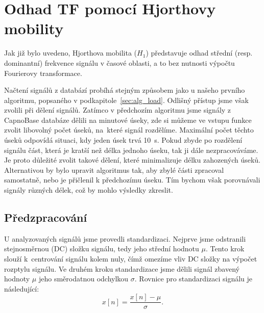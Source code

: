 \section{Odhad TF pomocí Hjorthovy mobility}
\label{sec:hjorth_mobilita_tf}
Jak již bylo uvedeno, Hjorthova mobilita (\( H_1 \)) představuje odhad střední (resp. dominantní) frekvence signálu v časové oblasti, a to bez nutnosti výpočtu Fourierovy transformace.

Načtení signálů z databází probíhá stejným způsobem jako u našeho prvního algoritmu, popsaného v podkapitole~\ref{sec:alg_load}.
Odlišný přístup jsme však zvolili při dělení signálů.
Zatímco v předchozím algoritmu jsme signály z CapnoBase databáze dělili na minutové úseky, zde si můžeme ve vstupu funkce zvolit libovolný počet úseků, na~které signál rozdělíme.
Maximální počet těchto úseků odpovídá situaci, kdy jeden úsek trvá 10~s.
Pokud zbyde po rozdělení signálu část, která je kratší než délka jednoho úseku, tak ji dále nezpracováváme.
Je proto důležité zvolit takové dělení, které minimalizuje délku zahozených úseků.
Alternativou by bylo upravit algoritmus tak, aby zbylé části zpracoval samostatně, nebo je přičlenil k předchozímu úseku.
Tím bychom však porovnávali signály různých délek, což by mohlo výsledky zkreslit.

\subsection*{Předzpracování}
\label{sec:predzpracovani}
U analyzovaných signálů jsme provedli standardizaci.
Nejprve jsme odstranili stejnosměrnou (\acs{DC}) složku signálu, tedy jeho střední hodnotu \(\mu\).
Tento krok slouží k~centrování signálu kolem nuly, čímž omezíme vliv \acs{DC} složky na výpočet rozptylu signálu.
Ve druhém kroku standardizace jsme dělili signál zbavený hodnoty \(\mu\) jeho směrodatnou odchylkou \(\sigma\).
Rovnice pro standardizaci signálu je následující:
\begin{equation}
	\label{eq:standardizace}
	x[n] = \frac{x[n] - \mu}{\sigma}.
\end{equation}

